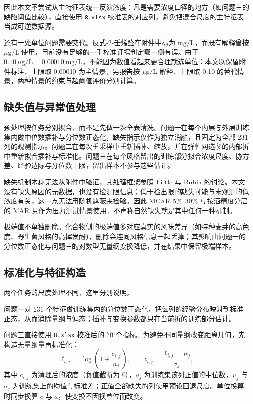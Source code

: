 \documentclass[UTF8,a4paper,zihao=-4]{ctexart}
\numberwithin{figure}{section}
\numberwithin{table}{section}
\numberwithin{equation}{section}
\newcommand{\file}[1]{\texttt{#1}}
\begin{document}
因此本文不尝试从主特征表统一反演浓度：凡是需要浓度口径的地方（如问题三的缺陷阈值比较），直接使用 \file{8.xlsx} 校准表的对应列，避免把混合尺度的主特征表当成可逆数据源。

还有一处单位问题需要交代。反式-2-壬烯醛在附件中标为 mg/L，而既有解释曾按 $\mu$g/L 使用，目前没有足够的一手校准证据判定哪一侧有误。由于 $0.10\ \mu\mathrm{g/L}=0.00010\ \mathrm{mg/L}$，不能因为数值看起来更合理就选单位：本文以保留附件标注、上限取 0.00010 为主情景，另报告按 $\mu$g/L 解释、上限取 0.10 的替代情景，两种情景的约束与超阈值评价分别计算。

\subsection{缺失值与异常值处理}

预处理按任务分别拟合，而不是先做一次全表清洗。问题一在每个内层与外层训练集内做中位数插补与分位数正态化，缺失指示仅作为独立消融，且固定为全部 231 列的观测指示。问题二在每次重采样中重新插补、缩放，并在弹性网选参的内部折中重新拟合插补与标准化。问题三在每个风格留出的训练部分拟合浓度尺度、协方差、经验边际与分位数上限，留出样本不参与这些估计。

缺失机制本身无法从附件中验证，其处理框架参照 Little 与 Rubin 的讨论\cite{little2019}。本文没有缺失原因的元数据，也没有检测限信息；低于检出限的缺失可能与未观测的低浓度有关，这一点无法用随机遮蔽来检验。因此 MCAR 5\%--30\% 与按酒精度分层的 MAR 只作为压力测试情景使用，不声称自然缺失就是其中任何一种机制。

极端值不单独删除。化合物侧的极端值多对应真实的风味差异（如特种麦芽的高色度、野生菌风格的高挥发酚），删除会连同风格信息一起丢掉；其影响由问题一的分位数正态化与问题三的对数型无量纲变换降低，并在结果中保留极端样本。

\subsection{标准化与特征构造}

两个任务的尺度处理不同，这里分别说明。

问题一对 231 个特征做训练集内的分位数正态化，把每列的经验分布映射到标准正态，从而消除量纲与偏态；插补与变换参数都只在当前折的训练部分估计。

问题三直接使用 \file{8.xlsx} 校准后的 70 个指标。为避免不同量纲改变距离几何，先构造无量纲量再标准化：
\begin{equation}
\ell_{i,j}=\log\left(1+\frac{c_{i,j}}{a_{j}}\right),\qquad
z_{i,j}=\frac{\ell_{i,j}-\mu_{j}}{\sigma_{j}},
\label{eq:q3scale}
\end{equation}
其中 $c_{i,j}$ 为清理后的浓度（负值截断为 0），$a_j$ 为训练集该列正值的中位数，$\mu_j$ 与 $\sigma_j$ 为训练集上的均值与标准差；正值全部缺失的列使用预设回退尺度。单位换算时同步换算 $c$ 与 $a$，使变换不因换单位而改变。
\end{document}
